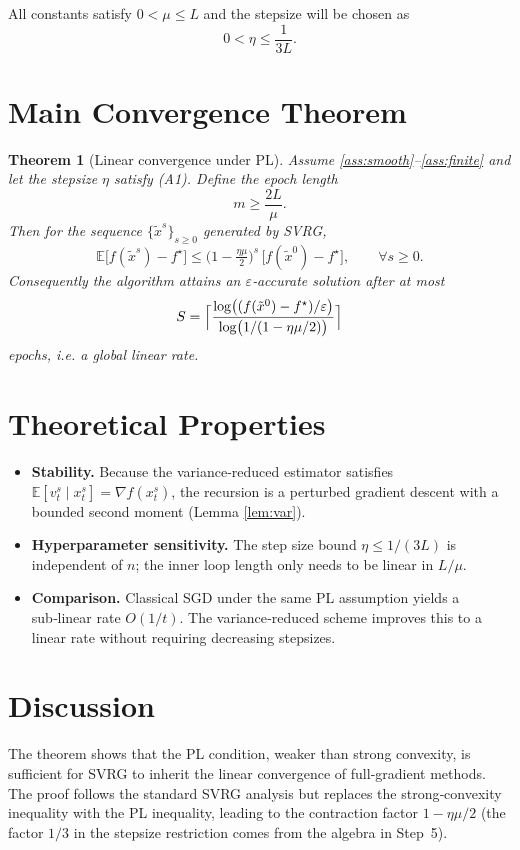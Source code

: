 \documentclass{article}
\newtheorem{theorem}{Theorem}[section]
\begin{document}
All constants satisfy $0<\mu\le L$ and the stepsize will be chosen as
\[
0<\eta\le \frac{1}{3L}. \tag{A1}
\]

\section*{Main Convergence Theorem}
\begin{theorem}[Linear convergence under PL]\label{thm:linear}
Assume \ref{ass:smooth}–\ref{ass:finite} and let the stepsize $\eta$ satisfy (A1).  
Define the epoch length
\[
m\ge \frac{2L}{\mu}. \tag{A2}
\]
Then for the sequence $\{\tilde{x}^{s}\}_{s\ge0}$ generated by SVRG,
\[
\mathbb{E}\!\bigl[f(\tilde{x}^{s})-f^{\star}\bigr]\le
\bigl(1-\tfrac{\eta\mu}{2}\bigr)^{s}\,\bigl[f(\tilde{x}^{0})-f^{\star}\bigr],
\qquad\forall s\ge0 .
\]
Consequently the algorithm attains an $\varepsilon$‑accurate solution after at most
\[
S = \Bigl\lceil\frac{\log\bigl((f(\tilde{x}^{0})-f^{\star})/\varepsilon\bigr)}{\log\bigl(1/(1-\eta\mu/2)\bigr)}\Bigr\rceil
\]
epochs, i.e. a \emph{global linear rate}.
\end{theorem}

\section*{Theoretical Properties}
\begin{itemize}
    \item \textbf{Stability.} Because the variance‑reduced estimator satisfies
          $\mathbb{E}[v_t^{s}\mid x_t^{s}]=\nabla f(x_t^{s})$, the recursion is a
          perturbed gradient descent with a bounded second moment (Lemma \ref{lem:var}).
    \item \textbf{Hyperparameter sensitivity.} The step size bound $\eta\le1/(3L)$
          is independent of $n$; the inner loop length only needs to be linear in $L/\mu$.
    \item \textbf{Comparison.} Classical SGD under the same PL assumption yields a
          sub‑linear rate $O(1/t)$. The variance‑reduced scheme improves this to a
          linear rate without requiring decreasing stepsizes.
\end{itemize}

\section*{Discussion}
The theorem shows that the PL condition, weaker than strong convexity,
is sufficient for SVRG to inherit the linear convergence of full‑gradient
methods. The proof follows the standard SVRG analysis but replaces the
strong‑convexity inequality with the PL inequality, leading to the contraction
factor $1-\eta\mu/2$ (the factor $1/3$ in the stepsize restriction comes from
the algebra in Step~5).
\end{document}
